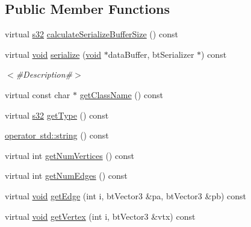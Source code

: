\subsection*{Public Member Functions}
\begin{DoxyCompactItemize}
\item 
virtual \mbox{\hyperlink{_util_8h_aa62c75d314a0d1f37f79c4b73b2292e2}{s32}} \mbox{\hyperlink{classnjli_1_1_physics_shape_static_plane_a43560ce1d910b68d20f602ab1fc03631}{calculate\+Serialize\+Buffer\+Size}} () const
\item 
virtual \mbox{\hyperlink{_thread_8h_af1e856da2e658414cb2456cb6f7ebc66}{void}} \mbox{\hyperlink{classnjli_1_1_physics_shape_static_plane_a95e3b4c85db36869d5cb85487b88cbad}{serialize}} (\mbox{\hyperlink{_thread_8h_af1e856da2e658414cb2456cb6f7ebc66}{void}} $\ast$data\+Buffer, bt\+Serializer $\ast$) const
\begin{DoxyCompactList}\small\item\em $<$\#\+Description\#$>$ \end{DoxyCompactList}\item 
virtual const char $\ast$ \mbox{\hyperlink{classnjli_1_1_physics_shape_static_plane_ae40c449320efcf3c483e7ff67b68b812}{get\+Class\+Name}} () const
\item 
virtual \mbox{\hyperlink{_util_8h_aa62c75d314a0d1f37f79c4b73b2292e2}{s32}} \mbox{\hyperlink{classnjli_1_1_physics_shape_static_plane_a2ca386d4ea821161f51aedf153581c16}{get\+Type}} () const
\item 
\mbox{\hyperlink{classnjli_1_1_physics_shape_static_plane_ad47cccb4bc99838d9f8f3820930ba028}{operator std\+::string}} () const
\item 
virtual int \mbox{\hyperlink{classnjli_1_1_physics_shape_static_plane_ab17422166a9a96672d671f8843c49f26}{get\+Num\+Vertices}} () const
\item 
virtual int \mbox{\hyperlink{classnjli_1_1_physics_shape_static_plane_ab6a794d539b83627a5ccd4f7b85a531d}{get\+Num\+Edges}} () const
\item 
virtual \mbox{\hyperlink{_thread_8h_af1e856da2e658414cb2456cb6f7ebc66}{void}} \mbox{\hyperlink{classnjli_1_1_physics_shape_static_plane_a7cbe0859434c8f246406de6e7927a0fe}{get\+Edge}} (int i, bt\+Vector3 \&pa, bt\+Vector3 \&pb) const
\item 
virtual \mbox{\hyperlink{_thread_8h_af1e856da2e658414cb2456cb6f7ebc66}{void}} \mbox{\hyperlink{classnjli_1_1_physics_shape_static_plane_ad6a9435112a9d9ebe56b0db5f8b2f5ce}{get\+Vertex}} (int i, bt\+Vector3 \&vtx) const
\item 

\end{DoxyCompactItemize}
